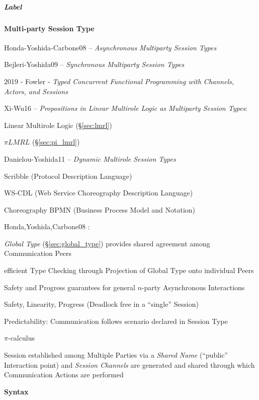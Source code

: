 \subparagraph{Label}\label{sec:channel_label}\hfill



\paragraph{Multi-party Session Type}\label{sec:multiparty_session}\hfill

Honda-Yoshida-Carbone08 -- \emph{Asynchronous Multiparty Session
  Types} \cite{honda-yoshida-carbone08}

Bejleri-Yoshida09 -- \emph{Synchronous Multiparty Session Types}

2019 - Fowler - \emph{Typed Concurrent Functional Programming with Channels,
  Actors, and Sessions}

Xi-Wu16 -- \emph{Propositions in Linear Multirole Logic as
  Multiparty Session Types}:

Linear Multirole Logic (\S\ref{sec:lmrl})

$\pi LMRL$ (\S\ref{sec:pi_lmrl})

Danielou-Yoshida11 -- \emph{Dynamic Multirole Session Types}

\fist Scribble (Protocol Description Language)

\fist WS-CDL (Web Service Choreography Description Language)

\fist Choreography BPMN (Business Process Model and Notation)


\asterism


Honda,Yoshida,Carbone08 \cite{honda-yoshida-carbone08}:

\emph{Global Type} (\S\ref{sec:global_type}) provides shared agreement among
Communication Peers

efficient Type Checking through Projection of Global Type onto
individual Peers

Safety and Progress guarantees for general $n$-party Asynchronous
Interactions

Safety, Linearity, Progress (Deadlock free in a ``single'' Session)

Predictability: Communication follows scenario declared in Session
Type

$\pi$-calculus

Session established among Multiple Parties via a \emph{Shared Name}
(``public'' Interaction point) and \emph{Session Channels} are
generated and shared through which Communication Actions are performed


\textbf{Syntax}

